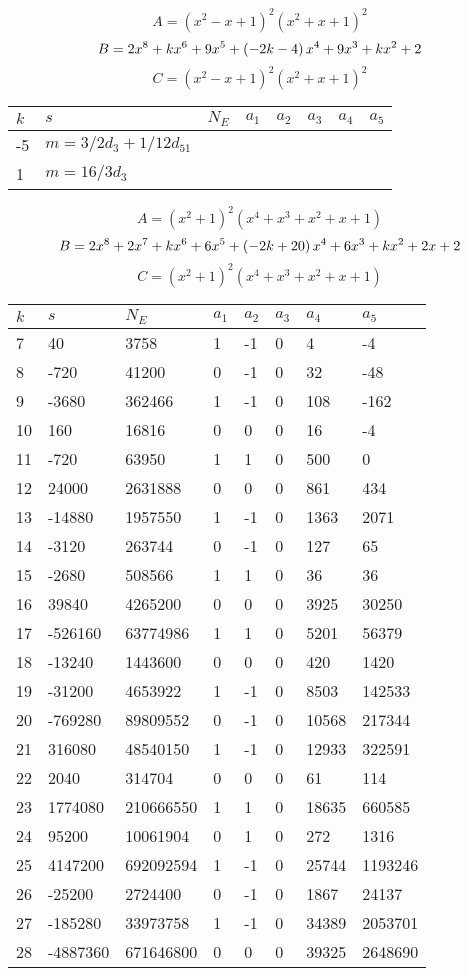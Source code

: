 \documentclass{amsart}
\begin{document}
$$A=(x^2
 - x
 + 1)^{2}(x^2
 + x
 + 1)^{2}$$
$$B=2\*x^8
 + k\*x^6
 + 9\*x^5
 + \left(-2\*k
 - 4\right) \*x^4
 + 9\*x^3
 + k\*x^2
 + 2$$
$$C=(x^2
 - x
 + 1)^{2}(x^2
 + x
 + 1)^{2}$$
\begin{longtable}{|l|l|l|lllll|}
\hline
$k$ & $s$ & $N_E$ & $a_1$ & $a_2$ & $a_3$ & $a_4$ & $a_5$\\
\hline
-5&$m=3/2d_{3}+1/12d_{51}$&&\multicolumn{5}{c|}{}\\
1&$m=16/3d_{3}$&&\multicolumn{5}{c|}{}\\
\hline
\end{longtable}
$$A=(x^2
 + 1)^{2}(x^4
 + x^3
 + x^2
 + x
 + 1)$$
$$B=2\*x^8
 + 2\*x^7
 + k\*x^6
 + 6\*x^5
 + \left(-2\*k
 + 20\right) \*x^4
 + 6\*x^3
 + k\*x^2
 + 2\*x
 + 2$$
$$C=(x^2
 + 1)^{2}(x^4
 + x^3
 + x^2
 + x
 + 1)$$
\begin{longtable}{|l|l|l|lllll|}
\hline
$k$ & $s$ & $N_E$ & $a_1$ & $a_2$ & $a_3$ & $a_4$ & $a_5$\\
\hline
7&40&3758&1&-1&0&4&-4\\
8&-720&41200&0&-1&0&32&-48\\
9&-3680&362466&1&-1&0&108&-162\\
10&160&16816&0&0&0&16&-4\\
11&-720&63950&1&1&0&500&0\\
12&24000&2631888&0&0&0&861&434\\
13&-14880&1957550&1&-1&0&1363&2071\\
14&-3120&263744&0&-1&0&127&65\\
15&-2680&508566&1&1&0&36&36\\
16&39840&4265200&0&0&0&3925&30250\\
17&-526160&63774986&1&1&0&5201&56379\\
18&-13240&1443600&0&0&0&420&1420\\
19&-31200&4653922&1&-1&0&8503&142533\\
20&-769280&89809552&0&-1&0&10568&217344\\
21&316080&48540150&1&-1&0&12933&322591\\
22&2040&314704&0&0&0&61&114\\
23&1774080&210666550&1&1&0&18635&660585\\
24&95200&10061904&0&1&0&272&1316\\
25&4147200&692092594&1&-1&0&25744&1193246\\
26&-25200&2724400&0&-1&0&1867&24137\\
27&-185280&33973758&1&-1&0&34389&2053701\\
28&-4887360&671646800&0&0&0&39325&2648690\\

\end{longtable}
\end{document}
